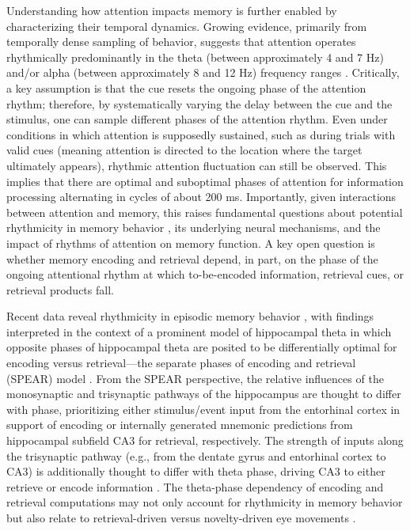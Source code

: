 Understanding how attention impacts memory is further enabled by characterizing their temporal dynamics. Growing evidence, primarily from temporally dense sampling of behavior, suggests that attention operates rhythmically predominantly in the theta (between approximately 4 and 7 Hz) and/or alpha (between approximately 8 and 12 Hz) frequency ranges \parencite[e.g.,][]{fiebelkorn2019rhythmic,vanrullen2016perceptual,vanrullen2011psychophysics}. Critically, a key assumption is that the cue resets the ongoing phase of the attention rhythm; therefore, by systematically varying the delay between the cue and the stimulus, one can sample different phases of the attention rhythm. Even under conditions in which attention is supposedly sustained, such as during trials with valid cues (meaning attention is directed to the location where the target ultimately appears), rhythmic attention fluctuation can still be observed. This implies that there are optimal and suboptimal phases of attention for information processing alternating in cycles of about 200 ms. Importantly, given interactions between attention and memory, this raises fundamental questions about potential rhythmicity in memory behavior \parencite{biba2024memory,terwal2021theta}, its underlying neural mechanisms, and the impact of rhythms of attention on memory function. A key open question is whether memory encoding and retrieval depend, in part, on the phase of the ongoing attentional rhythm at which to-be-encoded information, retrieval cues, or retrieval products fall.

Recent data reveal rhythmicity in episodic memory behavior \parencite{biba2024memory,terwal2021theta}, with findings interpreted in the context of a prominent model of hippocampal theta in which opposite phases of hippocampal theta are posited to be differentially optimal for encoding versus retrieval—the separate phases of encoding and retrieval (SPEAR) model \parencite[Fig.~\ref{fig:a2r-fig2}a;][]{hasselmo2002proposed}. From the SPEAR perspective, the relative influences of the monosynaptic and trisynaptic pathways of the hippocampus are thought to differ with phase, prioritizing either stimulus/event input from the entorhinal cortex in support of encoding or internally generated mnemonic predictions from hippocampal subfield CA3 for retrieval, respectively. The strength of inputs along the trisynaptic pathway (e.g., from the dentate gyrus and entorhinal cortex to CA3) is additionally thought to differ with theta phase, driving CA3 to either retrieve or encode information \parencite{kunec2005encoding}. The theta-phase dependency of encoding and retrieval computations may not only account for rhythmicity in memory behavior \parencite{biba2024memory,terwal2021theta} but also relate to retrieval-driven versus novelty-driven eye movements \parencite{kragel2020hippocampal}.

